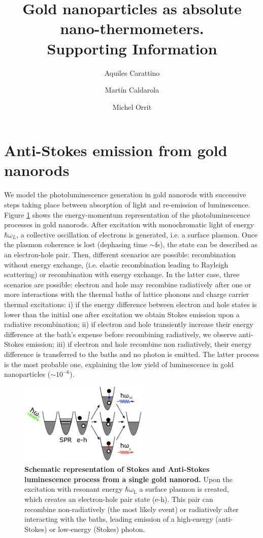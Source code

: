 \documentclass[journal=nalefd,manuscript=letter]{achemso}
\author{Aquiles Carattino}
\affiliation[Leiden]
{Huygens-Kamerlingh Onnes Lab, 2300RA Leiden, The Netherlands}
\author{Mart\'in Caldarola}
\affiliation[Leiden]
{Huygens-Kamerlingh Onnes Lab, 2300RA Leiden, The Netherlands}
\author{Michel Orrit}
\affiliation[Leiden]
{Huygens-Kamerlingh Onnes Lab, 2300RA Leiden, The Netherlands}
\title{Gold nanoparticles as absolute nano-thermometers. \\
Supporting Information}
\begin{document}
\maketitle


\section{Anti-Stokes emission from gold nanorods}\label{sec:AS}

We model the photoluminescence generation in gold nanorods with successive 
steps taking place between absorption of light and re-emission of luminescence\cite{Carattino2016a}. 
Figure \ref{fig:anti-Stokes-process} shows the energy-momentum representation
of the photoluminescence processes in gold nanorods. 
After excitation with monochromatic light of energy $\hbar \omega_L$, 
a collective oscillation of electrons is generated, i.e. a surface plasmon. 
Once the plasmon coherence is lost (dephasing time $\sim$fs), the state can be described as an
electron-hole pair. Then, different scenarios are possible: recombination 
without energy exchange, (i.e. elastic recombination leading to Rayleigh scattering) or 
recombination with energy exchange. In the latter case, three scenarios are possible: electron and hole may
recombine radiatively after one or more interactions with the thermal baths of
lattice phonons and charge carrier thermal excitations: i) if the energy
difference between electron and hole states is lower than the initial one after
excitation we obtain Stokes emission upon a radiative recombination; ii) if
electron and hole transiently increase their energy difference at the bath's
expense before recombining radiatively, we observe anti-Stokes emission; iii) if
electron and hole recombine non radiatively, their energy difference is
transferred to the baths and no photon is emitted. The latter process is the
most probable one, explaining the low yield of luminescence in gold nanoparticles ($\sim 10^{-6}$). 

\begin{figure}[htp] \centering
\includegraphics[width=0.55\textwidth]{Figures/Supplementary/01_AS_Scheme/luminescence_all_AS.png}
\caption{\textbf{Schematic representation of Stokes and Anti-Stokes luminescence process from a single gold nanorod.} 
Upon the excitation with resonant energy $\hbar \omega_\textrm{L}$ a surface plasmon is created, which creates 
an electron-hole pair state (e-h). This pair can recombine non-radiatively (the most likely event) or radiatively
after interacting with the baths, leading emission of a high-energy (anti-Stokes) or low-energy (Stokes) photon.}
	\label{fig:anti-Stokes-process}
\end{figure}
\end{document}

